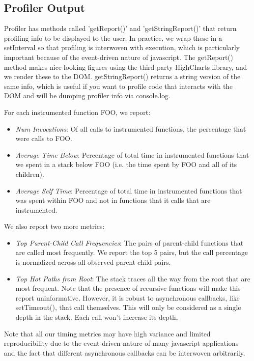 \documentclass[11pt]{article}
\begin{document}
\subsection{Profiler Output}
Profiler has methods called 'getReport()' and 'getStringReport()' that
return profiling info to be displayed to the user. In practice, we
wrap these in a setInterval so that profiling is interwoven with
execution, which is particularly important because of the event-driven
nature of javascript. The getReport() method makes nice-looking
figures using the third-party HighCharts library, and we render these
to the DOM. getStringReport() returns a string version of the same
info, which is useful if you want to profile code that interacts with
the DOM and will be dumping profiler info via console.log. 


For each instrumented function FOO, we report:
\begin{itemize}
\item \textit{Num Invocations}: Of all calls to
  instrumented functions, the percentage that were calls to FOO. 
\item  \textit{Average Time Below}: Percentage of total time in
  instrumented functions that we spent in a stack below FOO (i.e. the
  time spent by FOO and all of its children). 
\item \textit{Average Self Time}: Percentage of total time in
  instrumented functions that was spent within FOO and not in
  functions that it calls that are instrumented. 
\end{itemize}

We also report two more metrics:
\begin{itemize}
\item \textit{Top Parent-Child Call Frequencies}: The pairs of
parent-child functions that are called most frequently. We report the
top 5 pairs, but the call percentage is normalized across all observed
parent-child pairs.
\item \textit{Top Hot Paths from Root}: The stack traces all the way from the root
that are most frequent. Note that the presence of recursive functions
will make this report uninformative. However, it is robust to
asynchronous callbacks, like setTimeout(), that call themselves. This
will only be considered as a single depth in the stack. Each call
won't increase its depth. 
\end{itemize}

Note that all our timing metrics may have high variance and limited
reproducibility due to the event-driven nature of many javascript
applications and the fact that different asynchronous callbacks can be
interwoven arbitrarily. 
\end{document}
